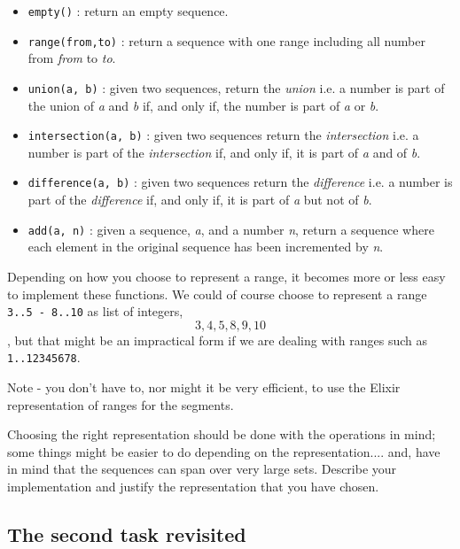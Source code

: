 \documentclass[a4paper,11pt]{article}
\begin{document}
\begin{itemize}
 \item {\tt empty()} : return an empty sequence.

 \item {\tt range(from,to)} : return a sequence with one range
   including all number from {\em from} to {\em to}.

 \item {\tt union(a, b)} : given two sequences, return the {\em union}
   i.e. a number is part of the union of {\em a} and {\em b} if, and
   only if, the number is part of {\em a} or {\em b}.

 \item {\tt intersection(a, b)} : given two sequences return the {\em
     intersection} i.e. a number is part of the {\em intersection} if, and
   only if, it is part of {\em a} and of {\em b}.

 \item {\tt difference(a, b)} : given two sequences return the {\em
     difference} i.e. a number is part of the {\em difference} if, and
   only if, it is part of {\em a} but not of {\em b}.

 \item {\tt add(a, n)} : given a sequence, {\em a}, and a number {\em n},
   return a sequence where each element in the original sequence has been
   incremented by {\em n}.
\end{itemize}

Depending on how you choose to represent a range, it becomes more or
less easy to implement these functions. We could of course choose to
represent a range {\tt 3..5 - 8..10} as list of
integers,{\tt \[3,4,5,8,9,10\]}, but that might be an impractical form
if we are dealing with ranges such as {\tt 1..12345678}.

Note - you don't have to, nor might it be very efficient, to use the
Elixir representation of ranges for the segments.

Choosing the right representation should be done with the operations in
mind; some things might be easier to do depending on the
representation.... and, have in mind that the sequences can span over
very large sets. Describe your implementation and justify the
representation that you have chosen.

\subsection*{The second task revisited}
\end{document}
